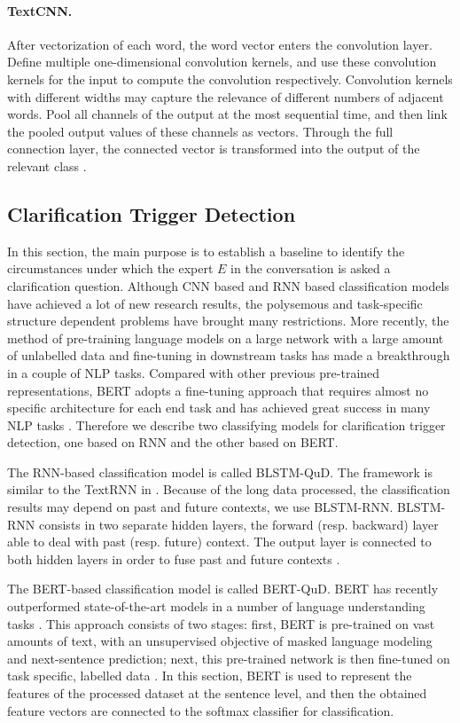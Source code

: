 \paragraph{TextCNN.} 
After vectorization of each word, the word vector enters the convolution layer. Define multiple one-dimensional convolution kernels, and use these convolution kernels for the input to compute the convolution respectively. Convolution kernels with different widths may capture the relevance of different numbers of adjacent words. Pool all channels of the output at the most sequential time, and then link the pooled output values of these channels as vectors. Through the full connection layer, the connected vector is transformed into the output of the relevant class \cite{DBLP:conf/emnlp/Kim14}.

\subsection{Clarification Trigger Detection}
\label{sec:trigger}
In this section, the main purpose is to establish a baseline to identify the circumstances under which the expert $E$ in the conversation is asked a clarification question. Although CNN based and RNN based classification models have achieved a lot of new research results, the polysemous and task-specific structure dependent problems have brought many restrictions. More recently, the method of pre-training language models on a large network with a large amount of unlabelled data and fine-tuning in downstream tasks has made a breakthrough in a couple of NLP tasks. Compared with other previous pre-trained representations, BERT adopts a fine-tuning approach that requires almost no specific architecture for each end task and has achieved great success in many NLP tasks \cite{DBLP:journals/access/YuSL19}. Therefore we describe two classifying models for clarification trigger detection, one based on RNN and the other based on BERT.

The RNN-based classification model is called BLSTM-QuD. The framework is similar to the TextRNN in . Because of the long data processed, the classification results may depend on past and future contexts, we use BLSTM-RNN. BLSTM-RNN consists in two separate hidden layers, the forward (resp. backward) layer able to deal with past (resp. future) context. The output layer is connected to both hidden layers in order to fuse past and future contexts \cite{DBLP:conf/icann/LefebvreBMG13}.

The BERT-based classification model is called BERT-QuD. BERT has recently outperformed state-of-the-art models in a number of language understanding tasks \cite{DBLP:conf/naacl/DevlinCLT19}. This approach consists of two stages: first, BERT is pre-trained on vast amounts of text, with an unsupervised objective of masked language modeling and next-sentence prediction; next, this pre-trained network is then fine-tuned on task specific, labelled data \cite{DBLP:journals/corr/abs-1904-08398}. In this section, BERT is used to represent the features of the processed dataset at the sentence level, and then the obtained feature vectors are connected to the softmax classifier for classification. 

